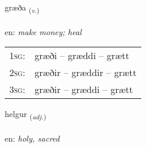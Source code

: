 \documentclass[frontgrid, backgrid]{flacards}\usepackage[]{graphicx}\usepackage[]{xcolor}
\begin{document}
\renewcommand{\flhead}{\vskip5pt \fboxsep=0pt {\small\bfseries\footnotesize Sagnorð | Verb}}
\renewcommand{\fcfoot}{\vskip5pt \fboxsep=0pt \hspace{2pt}{\small\bfseries\footnotesize 3K}}

\renewcommand{\blhead}{\vskip5pt {\small\bfseries\footnotesize Sagnorð | Verb }}
\renewcommand{\bcfoot}{\vskip5pt \hspace{2pt}{\small\bfseries\footnotesize 3K}}


{græða \small{\textsubscript{(\textit{v.})}} \\[1ex] %
\textphonetic{[kraiːða]} \\
en: \emph{make money; heal} \\  [2ex]
\renewcommand*{\arraystretch}{0.8}
\begin{tabular}{p{1cm}l}
\textsc{1sg}: & græði -- græddi -- grætt \\ 
\textsc{2sg}: & græðir -- græddir -- grætt \\ 
\textsc{3sg}: & græðir -- græddi -- grætt \\ 
\end{tabular}
}

\renewcommand{\flhead}{\vskip5pt \fboxsep=0pt {\small\bfseries\footnotesize Lýsingarorð | Adjective}}
\renewcommand{\fcfoot}{\vskip5pt \fboxsep=0pt \hspace{2pt}{\small\bfseries\footnotesize 3K}}

\renewcommand{\blhead}{\vskip5pt {\small\bfseries\footnotesize Lýsingarorð | Adjective }}
\renewcommand{\bcfoot}{\vskip5pt \hspace{2pt}{\small\bfseries\footnotesize 3K}}


{helgur \small{\textsubscript{(\textit{adj.})}} \\[1ex] %
\textphonetic{[hɛlkʏr]} \\
en: \emph{holy, sacred} \\  [2ex]
\renewcommand*{\arraystretch}{0.8}
}
\end{document}
